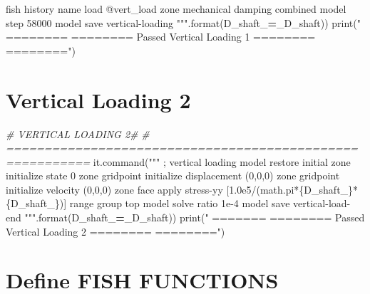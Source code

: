 \documentclass[a4paper, nobind]{templates/ociamthesis}
\newenvironment{Shaded}{\begin{snugshade}}{\end{snugshade}}
\newcommand{\BuiltInTok}[1]{#1}
\newcommand{\CommentTok}[1]{\textcolor[rgb]{0.56,0.35,0.01}{\textit{#1}}}
\newcommand{\NormalTok}[1]{#1}
\newcommand{\OperatorTok}[1]{\textcolor[rgb]{0.81,0.36,0.00}{\textbf{#1}}}
\newcommand{\SpecialCharTok}[1]{\textcolor[rgb]{0.00,0.00,0.00}{#1}}
\newcommand{\StringTok}[1]{\textcolor[rgb]{0.31,0.60,0.02}{#1}}
\renewenvironment{Shaded}
{
  \vspace{10pt}%
  \begin{snugshade}%
}{%
  \end{snugshade}%
  \vspace{8pt}%
}
\begin{document}
\begin{Shaded}
\begin{Highlighting}[]
\StringTok{fish history name \textquotesingle{}load\textquotesingle{} @vert\_load}
\StringTok{zone mechanical damping combined}
\StringTok{model step 58000}
\StringTok{model save \textquotesingle{}vertical{-}loading\textquotesingle{}}
\StringTok{"""}\NormalTok{.}\BuiltInTok{format}\NormalTok{(D\_shaft\_}\OperatorTok{=}\NormalTok{\_D\_shaft))}
\BuiltInTok{print}\NormalTok{(}\StringTok{"               ========       ======== Passed Vertical Loading 1 ========        ========"}\NormalTok{)}
\end{Highlighting}
\end{Shaded}

\hypertarget{vertical-loading-2}{%
\section{Vertical Loading 2}\label{vertical-loading-2}}

\begin{Shaded}
\begin{Highlighting}[]
\CommentTok{\# VERTICAL LOADING 2\#}
\CommentTok{\# =========================================================}
\NormalTok{it.command(}\StringTok{"""}
\StringTok{; vertical loading}
\StringTok{model restore \textquotesingle{}initial\textquotesingle{}}
\StringTok{zone initialize state 0}
\StringTok{zone gridpoint initialize displacement (0,0,0)}
\StringTok{zone gridpoint initialize velocity     (0,0,0)}
\StringTok{zone face apply stress{-}yy [1.0e5/(math.pi*}\SpecialCharTok{\{D\_shaft\_\}}\StringTok{*}\SpecialCharTok{\{D\_shaft\_\}}\StringTok{)] range group \textquotesingle{}top\textquotesingle{}}
\StringTok{model solve ratio 1e{-}4}
\StringTok{model save \textquotesingle{}vertical{-}load{-}end\textquotesingle{}}
\StringTok{"""}\NormalTok{.}\BuiltInTok{format}\NormalTok{(D\_shaft\_}\OperatorTok{=}\NormalTok{\_D\_shaft))}
\BuiltInTok{print}\NormalTok{(}\StringTok{"               =======        ======== Passed Vertical Loading 2 ========        ========"}\NormalTok{)}
\end{Highlighting}
\end{Shaded}

\hypertarget{define-fish-functions}{%
\section{Define FISH FUNCTIONS}\label{define-fish-functions}}
\end{document}
